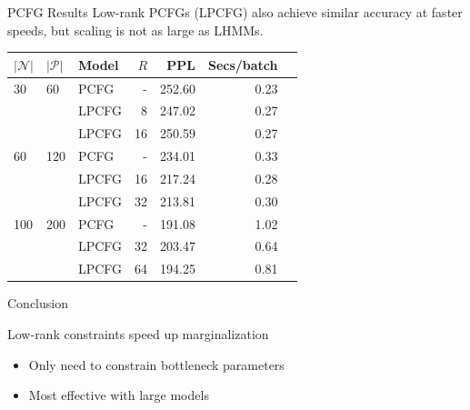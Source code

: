 \documentclass{beamer}
\newlength{\onecolwid}
\begin{document}
\begin{frame}
\begin{columns}[t]
\begin{column}{\onecolwid}
\begin{block}{PCFG Results}
Low-rank PCFGs (LPCFG) also achieve similar accuracy at faster speeds,
but scaling is not as large as LHMMs.
\begin{table}
\centering
\begin{tabular} {lllrrrr}
\toprule
$|\mathcal{N}|$ & $|\mathcal{P}|$ & Model & $R$ &  PPL & Secs/batch\\ %
\midrule
30  & 60    & PCFG & - & 252.60 &  0.23\\  %
    &       & LPCFG & 8 &  247.02    & 0.27\\ %
    &       & LPCFG & 16 & 250.59    & 0.27\\ %
\midrule
60  & 120   & PCFG & - & 234.01 &  0.33\\ %
    &       & LPCFG & 16& 217.24 & 0.28\\ %
    &       & LPCFG & 32& 213.81 & 0.30\\ %
\midrule
100 & 200   & PCFG & - &  191.08   & 1.02\\ %
    &       & LPCFG & 32& 203.47 & 0.64\\ %
    &       & LPCFG & 64& 194.25 & 0.81\\ %
\bottomrule
\end{tabular}
\end{table}
\end{block}


\begin{block}{Conclusion}

Low-rank constraints speed up marginalization
\begin{itemize}
\item Only need to constrain bottleneck parameters
\item Most effective with large models
\end{itemize}


\end{block}
\end{column}
\end{columns}
\end{frame}
\end{document}

